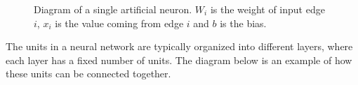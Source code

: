 \begin{figure}[H]
  \centering
    \caption{Diagram of a single artificial neuron. $W_{i}$ is the weight of input edge $i$, $x_{i}$ is the value coming from edge $i$ and $b$ is the bias.} %
    \label{fig:single_neuron}

\end{figure}

The units in a neural network are typically organized into different layers, where each layer has a fixed number of units. The diagram below is an example of how these units can be connected together.

